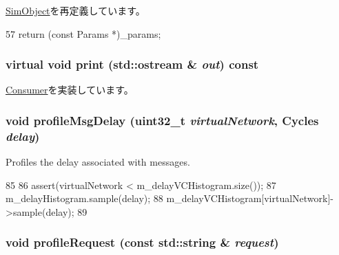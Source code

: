 \hyperlink{classSimObject_acd3c3feb78ae7a8f88fe0f110a718dff}{SimObject}を再定義しています。


\begin{DoxyCode}
57 { return (const Params *)_params; }
\end{DoxyCode}
\hypertarget{classAbstractController_a3ea5f7af5db62cc24f4e40df9ea5c971}{
\subsubsection[{print}]{\setlength{\rightskip}{0pt plus 5cm}virtual void print (std::ostream \& {\em out}) const}}
\label{classAbstractController_a3ea5f7af5db62cc24f4e40df9ea5c971}


\hyperlink{classConsumer_a3ea5f7af5db62cc24f4e40df9ea5c971}{Consumer}を実装しています。\hypertarget{classAbstractController_a6bc3835966ece2b6fb72a056f447a68e}{
\subsubsection[{profileMsgDelay}]{\setlength{\rightskip}{0pt plus 5cm}void profileMsgDelay ({\bf uint32\_\-t} {\em virtualNetwork}, \/  {\bf Cycles} {\em delay})}}
\label{classAbstractController_a6bc3835966ece2b6fb72a056f447a68e}


Profiles the delay associated with messages. 


\begin{DoxyCode}
85 {
86     assert(virtualNetwork < m_delayVCHistogram.size());
87     m_delayHistogram.sample(delay);
88     m_delayVCHistogram[virtualNetwork]->sample(delay);
89 }
\end{DoxyCode}
\hypertarget{classAbstractController_a8bb6029436f36f339582bda79270fa10}{
\subsubsection[{profileRequest}]{\setlength{\rightskip}{0pt plus 5cm}void profileRequest (const std::string \& {\em request})}}
\label{classAbstractController_a8bb6029436f36f339582bda79270fa10}


